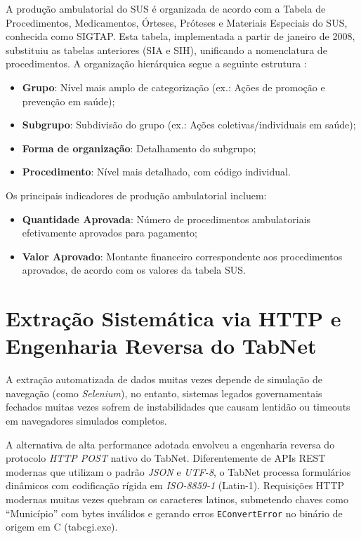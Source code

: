 \documentclass[
    12pt,
    oneside,
    a4paper,
    chapter=TITLE,
    section=TITLE
]{abntex2}
\begin{document}
A produção ambulatorial do SUS é organizada de acordo com a Tabela de Procedimentos, Medicamentos, Órteses, Próteses e Materiais Especiais do SUS, conhecida como SIGTAP. Esta tabela, implementada a partir de janeiro de 2008, substituiu as tabelas anteriores (SIA e SIH), unificando a nomenclatura de procedimentos. A organização hierárquica segue a seguinte estrutura \cite{sigtap2026}:

\begin{itemize}
    \item \textbf{Grupo}: Nível mais amplo de categorização (ex.: Ações de promoção e prevenção em saúde);
    \item \textbf{Subgrupo}: Subdivisão do grupo (ex.: Ações coletivas/individuais em saúde);
    \item \textbf{Forma de organização}: Detalhamento do subgrupo;
    \item \textbf{Procedimento}: Nível mais detalhado, com código individual.
\end{itemize}

Os principais indicadores de produção ambulatorial incluem:

\begin{itemize}
    \item \textbf{Quantidade Aprovada}: Número de procedimentos ambulatoriais efetivamente aprovados para pagamento;
    \item \textbf{Valor Aprovado}: Montante financeiro correspondente aos procedimentos aprovados, de acordo com os valores da tabela SUS.
\end{itemize}

\section{Extração Sistemática via HTTP e Engenharia Reversa do TabNet}

A extração automatizada de dados muitas vezes depende de simulação de navegação (como \textit{Selenium}), no entanto, sistemas legados governamentais fechados muitas vezes sofrem de instabilidades que causam lentidão ou timeouts em navegadores simulados completos.

A alternativa de alta performance adotada envolveu a engenharia reversa do protocolo \textit{HTTP POST} nativo do TabNet. Diferentemente de APIs REST modernas que utilizam o padrão \textit{JSON} e \textit{UTF-8}, o TabNet processa formulários dinâmicos com codificação rígida em \textit{ISO-8859-1} (Latin-1). Requisições HTTP modernas muitas vezes quebram os caracteres latinos, submetendo chaves como ``Município'' com bytes inválidos e gerando erros \texttt{EConvertError} no binário de origem em C (tabcgi.exe).
\end{document}

